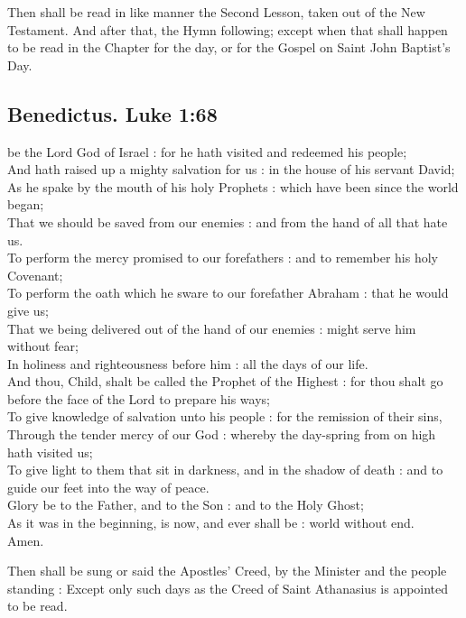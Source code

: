 \begin{rubric}
Then shall be read in like manner the Second Lesson, taken out of the New Testament. And after that, the Hymn following; except when that shall happen to be read in the Chapter for the day, or for the Gospel on Saint John Baptist's Day.
\end{rubric}

\subsection{Benedictus. Luke 1:68}

 be the Lord God of Israel : for he hath visited and redeemed his people;\\
And hath raised up a mighty salvation for us : in the house of his servant David;\\
As he spake by the mouth of his holy Prophets : which have been since the world began;\\
That we should be saved from our enemies : and from the hand of all that hate us.\\
To perform the mercy promised to our forefathers : and to remember his holy Covenant;\\
To perform the oath which he sware to our forefather Abraham : that he would give us;\\
That we being delivered out of the hand of our enemies : might serve him without fear;\\
In holiness and righteousness before him : all the days of our life.\\
And thou, Child, shalt be called the Prophet of the Highest : for thou shalt go before the face of the Lord to prepare his ways;\\
To give knowledge of salvation unto his people : for the remission of their sins,\\
Through the tender mercy of our God : whereby the day-spring from on high hath visited us;\\
To give light to them that sit in darkness, and in the shadow of death : and to guide our feet into the way of peace.\\
Glory be to the Father, and to the Son : and to the Holy Ghost;\\
As it was in the beginning, is now, and ever shall be : world without end.\\
Amen.

\begin{rubric}
Then shall be sung or said the Apostles' Creed, by the Minister and the people standing : Except only such days as the Creed of Saint Athanasius is appointed to be read.
\end{rubric}

